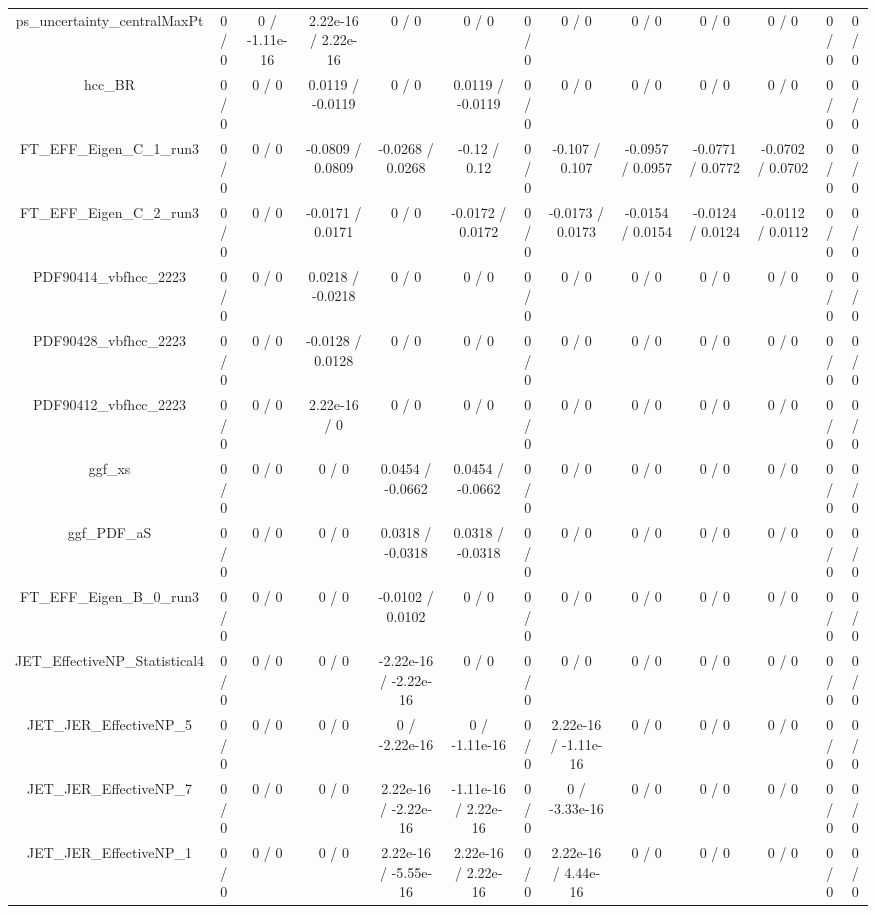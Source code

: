 \documentclass[10pt]{article}
\begin{document}
\begin{table}[htbp]
\begin{center}
\begin{tabular}{|c|c|c|c|c|c|c|c|c|c|c|c|c|}
  ps_uncertainty_centralMaxPt & 0 / 0 & 0 / -1.11e-16 & 2.22e-16 / 2.22e-16 & 0 / 0 & 0 / 0 & 0 / 0 & 0 / 0 & 0 / 0 & 0 / 0 & 0 / 0 & 0 / 0 & 0 / 0 \\ 
  hcc_BR & 0 / 0 & 0 / 0 & 0.0119 / -0.0119 & 0 / 0 & 0.0119 / -0.0119 & 0 / 0 & 0 / 0 & 0 / 0 & 0 / 0 & 0 / 0 & 0 / 0 & 0 / 0 \\ 
  FT_EFF_Eigen_C_1_run3 & 0 / 0 & 0 / 0 & -0.0809 / 0.0809 & -0.0268 / 0.0268 & -0.12 / 0.12 & 0 / 0 & -0.107 / 0.107 & -0.0957 / 0.0957 & -0.0771 / 0.0772 & -0.0702 / 0.0702 & 0 / 0 & 0 / 0 \\ 
  FT_EFF_Eigen_C_2_run3 & 0 / 0 & 0 / 0 & -0.0171 / 0.0171 & 0 / 0 & -0.0172 / 0.0172 & 0 / 0 & -0.0173 / 0.0173 & -0.0154 / 0.0154 & -0.0124 / 0.0124 & -0.0112 / 0.0112 & 0 / 0 & 0 / 0 \\ 
  PDF90414_vbfhcc_2223 & 0 / 0 & 0 / 0 & 0.0218 / -0.0218 & 0 / 0 & 0 / 0 & 0 / 0 & 0 / 0 & 0 / 0 & 0 / 0 & 0 / 0 & 0 / 0 & 0 / 0 \\ 
  PDF90428_vbfhcc_2223 & 0 / 0 & 0 / 0 & -0.0128 / 0.0128 & 0 / 0 & 0 / 0 & 0 / 0 & 0 / 0 & 0 / 0 & 0 / 0 & 0 / 0 & 0 / 0 & 0 / 0 \\ 
  PDF90412_vbfhcc_2223 & 0 / 0 & 0 / 0 & 2.22e-16 / 0 & 0 / 0 & 0 / 0 & 0 / 0 & 0 / 0 & 0 / 0 & 0 / 0 & 0 / 0 & 0 / 0 & 0 / 0 \\ 
  ggf_xs & 0 / 0 & 0 / 0 & 0 / 0 & 0.0454 / -0.0662 & 0.0454 / -0.0662 & 0 / 0 & 0 / 0 & 0 / 0 & 0 / 0 & 0 / 0 & 0 / 0 & 0 / 0 \\ 
  ggf_PDF_aS & 0 / 0 & 0 / 0 & 0 / 0 & 0.0318 / -0.0318 & 0.0318 / -0.0318 & 0 / 0 & 0 / 0 & 0 / 0 & 0 / 0 & 0 / 0 & 0 / 0 & 0 / 0 \\ 
  FT_EFF_Eigen_B_0_run3 & 0 / 0 & 0 / 0 & 0 / 0 & -0.0102 / 0.0102 & 0 / 0 & 0 / 0 & 0 / 0 & 0 / 0 & 0 / 0 & 0 / 0 & 0 / 0 & 0 / 0 \\ 
  JET_EffectiveNP_Statistical4 & 0 / 0 & 0 / 0 & 0 / 0 & -2.22e-16 / -2.22e-16 & 0 / 0 & 0 / 0 & 0 / 0 & 0 / 0 & 0 / 0 & 0 / 0 & 0 / 0 & 0 / 0 \\ 
  JET_JER_EffectiveNP_5 & 0 / 0 & 0 / 0 & 0 / 0 & 0 / -2.22e-16 & 0 / -1.11e-16 & 0 / 0 & 2.22e-16 / -1.11e-16 & 0 / 0 & 0 / 0 & 0 / 0 & 0 / 0 & 0 / 0 \\ 
  JET_JER_EffectiveNP_7 & 0 / 0 & 0 / 0 & 0 / 0 & 2.22e-16 / -2.22e-16 & -1.11e-16 / 2.22e-16 & 0 / 0 & 0 / -3.33e-16 & 0 / 0 & 0 / 0 & 0 / 0 & 0 / 0 & 0 / 0 \\ 
  JET_JER_EffectiveNP_1 & 0 / 0 & 0 / 0 & 0 / 0 & 2.22e-16 / -5.55e-16 & 2.22e-16 / 2.22e-16 & 0 / 0 & 2.22e-16 / 4.44e-16 & 0 / 0 & 0 / 0 & 0 / 0 & 0 / 0 & 0 / 0 \\ 

\end{tabular}
\end{center}
\end{table}
\end{document}
